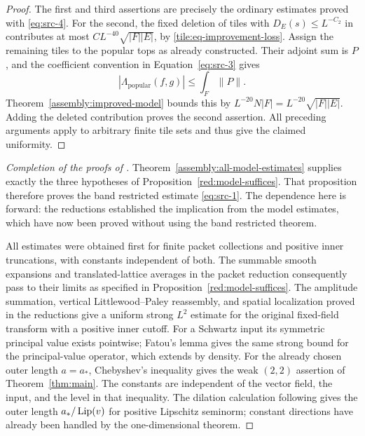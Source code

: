 \begin{proof}
The first and third assertions are precisely the ordinary estimates
proved with \eqref{eq:src-4}.  For the second, the fixed deletion
of tiles with \(D_E(s)\le L^{-C_2}\) in 
contributes at most \(CL^{-40}\sqrt{|F||E|}\), by
\eqref{tile:eq-improvement-loss}.  Assign the remaining tiles to the popular tops
as already constructed.  Their adjoint sum is \(P\), and the
coefficient convention in Equation~\eqref{eq:src-3} gives
\[
 |\Lambda_{\mathrm{popular}}(f,g)|
       \le\int_F\|P\|.
\]
Theorem~\ref{assembly:improved-model} bounds this by
\(L^{-20}N|F|=L^{-20}\sqrt{|F||E|}\).  Adding the deleted
contribution proves the second assertion.  All preceding arguments
apply to arbitrary finite tile sets and thus give the claimed
uniformity.
\end{proof}

\begin{proof}[Completion of the proofs of ]
Theorem~\ref{assembly:all-model-estimates} supplies exactly the three
hypotheses of Proposition~\ref{red:model-suffices}.  That proposition
therefore proves the band restricted estimate
\eqref{eq:src-1}.  The dependence here is forward: the
reductions established the implication from the model estimates,
which have now been proved without using the band restricted theorem.

All estimates were obtained first for finite packet collections and
positive inner truncations, with constants independent of both.
The summable smooth expansions and translated-lattice averages in the
packet reduction consequently pass to their limits as specified in
Proposition~\ref{red:model-suffices}.  The amplitude summation,
vertical Littlewood--Paley reassembly, and spatial localization proved
in the reductions give a uniform strong \(L^2\) estimate for the
original fixed-field transform with a positive inner cutoff.  For a
Schwartz input its symmetric principal value exists pointwise; Fatou's
lemma gives the same strong bound for the principal-value operator, which
extends by density.  For the already chosen outer length \(a=a_*\),
Chebyshev's inequality gives the weak \((2,2)\) assertion
of Theorem~\ref{thm:main}.  The constants are independent of the
vector field, the input, and the level in that inequality. The dilation
calculation following  gives the outer length
\(a_*/\operatorname{Lip}(v)\) for positive Lipschitz seminorm; constant directions
have already been handled by the one-dimensional theorem.
\end{proof}
